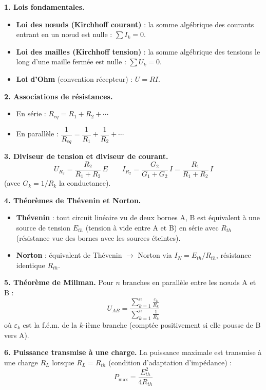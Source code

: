 \documentclass[12pt,a4paper]{article}
\begin{document}
\begin{boiteresume}

\textbf{1. Lois fondamentales.}
\begin{itemize}[nosep]
  \item \textbf{Loi des n\oe{}uds (Kirchhoff courant)} : la somme algébrique des courants entrant en un n\oe{}ud est nulle : $\sum I_k = 0$.
  \item \textbf{Loi des mailles (Kirchhoff tension)} : la somme algébrique des tensions le long d'une maille fermée est nulle : $\sum U_k = 0$.
  \item \textbf{Loi d'Ohm} (convention récepteur) : $U = RI$.
\end{itemize}

\textbf{2. Associations de résistances.}
\begin{itemize}[nosep]
  \item En série : $R_{eq} = R_1 + R_2 + \cdots$
  \item En parallèle : $\dfrac{1}{R_{eq}} = \dfrac{1}{R_1} + \dfrac{1}{R_2} + \cdots$
\end{itemize}

\textbf{3. Diviseur de tension et diviseur de courant.}
\[
U_{R_2} = \frac{R_2}{R_1 + R_2}\,E \qquad I_{R_2} = \frac{G_2}{G_1 + G_2}\,I = \frac{R_1}{R_1 + R_2}\,I
\]
(avec $G_k = 1/R_k$ la conductance).

\textbf{4. Théorèmes de Thévenin et Norton.}
\begin{itemize}[nosep]
  \item \textbf{Thévenin} : tout circuit linéaire vu de deux bornes A, B est équivalent à une source de tension $E_{th}$ (tension à vide entre A et B) en série avec $R_{th}$ (résistance vue des bornes avec les sources éteintes).
  \item \textbf{Norton} : équivalent de Thévenin $\to$ Norton via $I_N = E_{th}/R_{th}$, résistance identique $R_{th}$.
\end{itemize}

\textbf{5. Théorème de Millman.}
Pour $n$ branches en parallèle entre les n\oe{}uds A et B :
\[
U_{AB} = \frac{\displaystyle\sum_{k=1}^{n} \frac{\varepsilon_k}{R_k}}{\displaystyle\sum_{k=1}^{n} \frac{1}{R_k}}
\]
où $\varepsilon_k$ est la f.é.m. de la $k$-ième branche (comptée positivement si elle pousse de B vers A).

\textbf{6. Puissance transmise à une charge.} La puissance maximale est transmise à une charge $R_L$ lorsque $R_L = R_{th}$ (condition d'adaptation d'impédance) :
\[
P_{\max} = \frac{E_{th}^2}{4R_{th}}
\]

\end{boiteresume}
\end{document}
